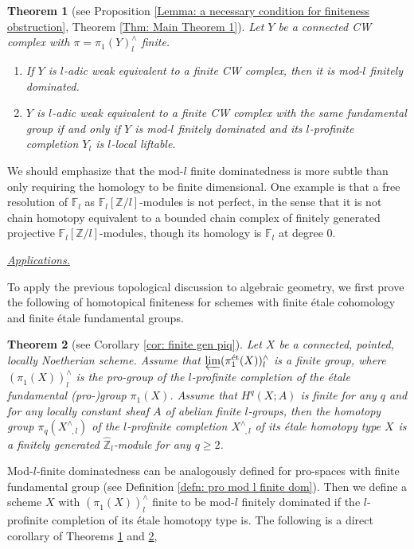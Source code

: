 \documentclass[11pt]{amsart}
\newtheorem{theorem}{Theorem}[section]
\theoremstyle{definition}
\numberwithin{equation}{section}
\numberwithin{equation}{section}
\newcommand\ZZ{\mathbb{Z}}
\newcommand\FF{\mathbb{F}}
\DeclareMathOperator{\et}{\acute{e}t}
\begin{document}
\begin{theorem}[see Proposition \ref{Lemma: a necessary condition for finiteness obstruction}, Theorem \ref{Thm: Main Theorem 1}]\label{Thm: Main Intro}
Let $Y$ be a connected CW complex with $\pi=\pi_1(Y)^{\wedge}_l$ finite.
\begin{enumerate}
    \item If $Y$ is $l$-adic weak equivalent to a finite CW complex, then it is mod-$l$ finitely dominated.
    \item $Y$ is $l$-adic weak equivalent to a finite CW complex with the same fundamental group if and only if $Y$ is mod-$l$ finitely dominated and its $l$-profinite completion $Y_l$ is $l$-local liftable.
\end{enumerate}
\end{theorem}

We should emphasize that the mod-$l$ finite dominatedness is more subtle than only requiring the homology to be finite dimensional. One example is that a free resolution of $\FF_l$ as $\FF_l[\ZZ/l]$-modules is not perfect, in the sense that it is not chain homotopy equivalent to a bounded chain complex of finitely generated projective $\FF_l[\ZZ/l]$-modules, though its homology is $\FF_l$ at degree $0$.

\underline{\textit{Applications.}} 

To apply the previous topological discussion to algebraic geometry, we first prove the following of homotopical finiteness for schemes with finite \'etale cohomology and finite \'etale fundamental groups.

\begin{theorem}[see Corollary \ref{cor: finite gen piq}]\label{Thm: Main Intro II}
Let $X$ be a connected, pointed, locally Noetherian scheme. Assume that $\varprojlim (\pi^{\et}_1(X))^{\wedge}_l$ is a finite group, where $(\pi^{\et}_1(X))^{\wedge}_l$ is the pro-group of the $l$-profinite completion of the \'etale fundamental (pro-)group $\pi^{\et}_1(X)$. Assume that $H^{q}_{\et}(X;A)$ is finite for any $q$ and for any locally constant sheaf $A$ of abelian finite $l$-groups, then the homotopy group $\pi_q(X^{\wedge}_{\et,l})$ of the $l$-profinite completion $X^{\wedge}_{\et,l}$ of its \'etale homotopy type $X_{\et}$ is a finitely generated $\widehat{\ZZ}_l$-module for any $q\geq 2$.
\end{theorem}

Mod-$l$-finite dominatedness can be analogously defined for pro-spaces with finite fundamental group (see Definition \ref{defn: pro mod l finite dom}).
Then we define a scheme $X$ with  $(\pi_1^{\et}(X))^{\wedge}_l$ finite to be mod-$l$ finitely dominated if the $l$-profinite completion of its étale homotopy type is. The following is a direct corollary of Theorems \ref{Thm: Main Intro} and \ref{Thm: Main Intro II},
\end{document}
